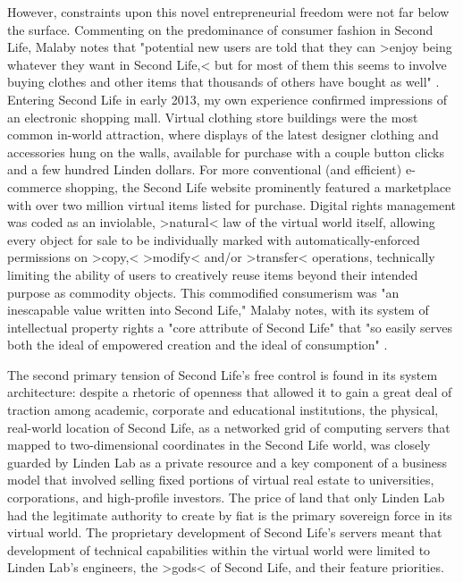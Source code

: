 However, constraints upon this novel entrepreneurial freedom were not far below the surface. Commenting on the predominance of consumer fashion in Second Life, Malaby notes that "potential new users are told that they can >enjoy being whatever they want in Second Life,< but for most of them this seems to involve buying clothes and other items that thousands of others have bought as well" \autocite*[114]{Malaby2011-my}. Entering Second Life in early 2013, my own experience confirmed impressions of an electronic shopping mall. Virtual clothing store buildings were the most common in-world attraction, where displays of the latest designer clothing and accessories hung on the walls, available for purchase with a couple button clicks and a few hundred Linden dollars. For more conventional (and efficient) e-commerce shopping, the Second Life website prominently featured a marketplace with over two million virtual items listed for purchase. Digital rights management was coded as an inviolable, >natural< law of the virtual world itself, allowing every object for sale to be individually marked with automatically-enforced permissions on >copy,< >modify< and/or >transfer< operations, technically limiting the ability of users to creatively reuse items beyond their intended purpose as commodity objects. This commodified consumerism was "an inescapable value written into Second Life," Malaby notes, with its system of intellectual property rights a "core attribute of Second Life" that "so easily serves both the ideal of empowered creation and the ideal of consumption" \autocite[115]{Malaby2011-my}.

The second primary tension of Second Life's free control is found in its system architecture: despite a rhetoric of openness that allowed it to gain a great deal of traction among academic, corporate and educational institutions, the physical, real-world location of Second Life, as a networked grid of computing servers that mapped to two-dimensional coordinates in the Second Life world, was closely guarded by Linden Lab as a private resource and a key component of a business model that involved selling fixed portions of virtual real estate to universities, corporations, and high-profile investors. The price of land that only Linden Lab had the legitimate authority to create by fiat is the primary sovereign force in its virtual world. The proprietary development of Second Life's servers meant that development of technical capabilities within the virtual world were limited to Linden Lab's engineers, the >gods< of Second Life, and their feature priorities.

